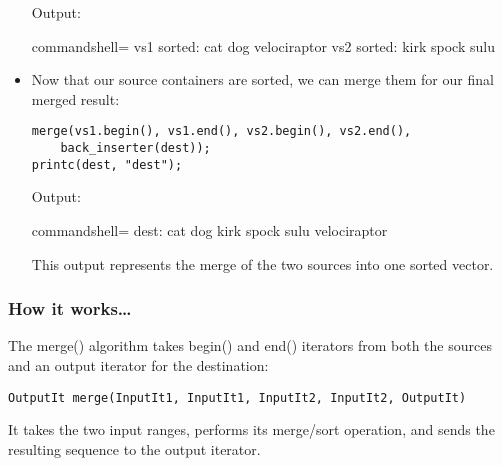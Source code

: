 \begin{itemize}
Output:

\begin{tcblisting}{commandshell={}}
vs1 sorted: cat dog velociraptor
vs2 sorted: kirk spock sulu
\end{tcblisting}

\item 
Now that our source containers are sorted, we can merge them for our final merged result:

\begin{lstlisting}[style=styleCXX]
merge(vs1.begin(), vs1.end(), vs2.begin(), vs2.end(),
	back_inserter(dest));
printc(dest, "dest");
\end{lstlisting}

Output:

\begin{tcblisting}{commandshell={}}
dest: cat dog kirk spock sulu velociraptor
\end{tcblisting}

This output represents the merge of the two sources into one sorted vector.
\end{itemize}

\subsubsection{How it works…}

The merge() algorithm takes begin() and end() iterators from both the sources and an output iterator for the destination:

\begin{lstlisting}[style=styleCXX]
OutputIt merge(InputIt1, InputIt1, InputIt2, InputIt2, OutputIt)
\end{lstlisting}

It takes the two input ranges, performs its merge/sort operation, and sends the resulting sequence to the output iterator.

















